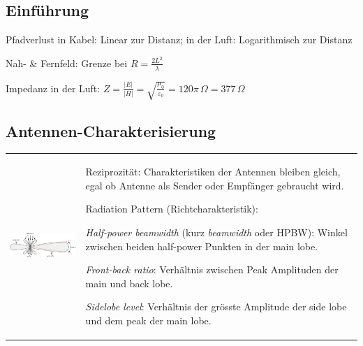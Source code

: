 \subsection{Einführung }
\begin{liste}
    \item Pfadverlust in Kabel: Linear zur Distanz; in der Luft: Logarithmisch zur Distanz
    \item Nah- \& Fernfeld: Grenze bei $R = \frac{2L^2}{\lambda}$
    \item Impedanz in der Luft: 
    $Z=\frac{|E|}{|H|}=\sqrt{\frac{\mu_0}{\varepsilon_0}}=120\pi \,\Omega= 377\,\Omega$
\end{liste}


\subsection{Antennen-Charakterisierung }
\begin{tabular}{ll}
\parbox{6cm}{
    \includegraphics[width=6cm]{./bilder/antennas-radiation-pattern.png}}
& \parbox{12cm}{
\begin{liste}
	    \item Reziprozität: Charakteristiken der Antennen bleiben gleich, egal ob Antenne
	    als Sender oder Empfänger gebraucht wird.
	    \item Radiation Pattern (Richtcharakteristik): 
	    \begin{liste}
		    \item {\em Half-power beamwidth} (kurz {\em beamwidth} oder HPBW): Winkel
		    zwischen beiden half-power Punkten in der main lobe.
		    \item {\em Front-back ratio}: Verhältnis zwischen Peak Amplituden der main
		    und back lobe.
		    \item {\em Sidelobe level}: Verhältnis der grösste Amplitude der side
		    lobe und dem peak der main lobe.
	    \end{liste}
	\end{liste}
	}
\end{tabular}\\
